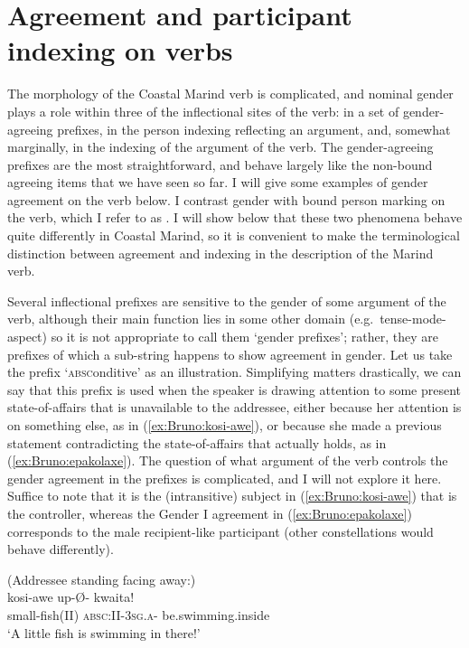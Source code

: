 \documentclass[output=collectionpaper]{langsci/langscibook}
\begin{document}
\section{Agreement and participant indexing on verbs}\label{sec:Bruno:Mar-indexing}

The morphology of the Coastal Marind verb is complicated, and nominal gender plays a role within three of the inflectional sites of the verb: in a set of gender-agreeing prefixes, in the person indexing reflecting an  argument, and, somewhat marginally, in the indexing of the  argument of the verb. The gender-agreeing prefixes are the most straightforward, and behave largely like the non-bound agreeing items that we have seen so far. I will give some examples of gender agreement on the verb below. I contrast gender  with bound person marking on the verb, which I refer to as . I will show below that these two phenomena behave quite differently in Coastal Marind, so it is convenient to make the terminological distinction between agreement and indexing in the description of the Marind verb.

Several inflectional prefixes are sensitive to the gender of some argument of the verb, although their main function lies in some other domain (e.g.\ tense-mode-aspect) so it is not appropriate to call them `gender prefixes'; rather, they are prefixes of which a sub-string happens to show agreement in gender. Let us take the prefix  `\textsc{absc}onditive' as an illustration. Simplifying matters drastically, we can say that this prefix is used when the speaker is drawing attention to some present state-of-affairs that is unavailable to the addressee, either because her attention is on something else, as in (\ref{ex:Bruno:kosi-awe}), or because she made a previous statement contradicting the state-of-affairs that actually holds, as in (\ref{ex:Bruno:epakolaxe}). The question of what argument of the verb controls the gender agreement in the prefixes is complicated, and I will not explore it here. Suffice to note that it is the (intransitive) subject in (\ref{ex:Bruno:kosi-awe}) that is the controller, whereas the Gender I agreement in (\ref{ex:Bruno:epakolaxe}) corresponds to the male recipient-like participant (other constellations would behave differently).

\ea
\label{ex:Bruno:kosi-awe}
(Addressee standing facing away:)\\
\gll kosi-awe up-\O- kwa\GH ita! \\
small-fish(II) \textsc{absc}:II-3\textsc{sg}.\textsc{a}- be.swimming.inside\\
\glt `A little fish is swimming in there!'
\z
\end{document}
